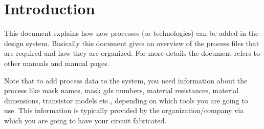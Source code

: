 \chapter{Introduction}

This document explains how new processes (or technologies) can 
be added in the design system.
Basically this document gives an overview of the process files
that are required and how they are organized.
For more details the document refers to other manuals and manual pages.

Note that to add process data to the system, you need
information about the process like mask names, mask gds numbers,
material resistances, material dimensions, transistor
models etc., depending on which tools you are going to use.
This information is typically provided by the 
organization/company via which you are going
to have your circuit fabricated.
